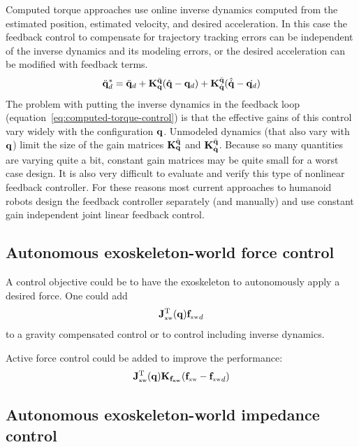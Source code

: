 \documentclass[letterpaper,12pt,fullpage]{article}
\newcommand{\xw}{{\mbox {\tiny xw}}}
\begin{document}
Computed torque approaches use online inverse dynamics computed from the estimated
position, estimated velocity, and desired acceleration.
In this case the feedback control to compensate for trajectory tracking errors can
be independent of the inverse dynamics and its modeling errors, or the desired
acceleration can be modified with feedback terms.
\begin{equation}
\ddot{{\bf q}}_d^* = \ddot{{\bf q}}_{d} + {\bf K}_{{\bf q}}^{\ddot{{\bf q}}} ( \hat{{\bf q}} - {\bf q}_d ) 
+ {\bf K}_{\dot{{\bf q}}}^{\ddot{{\bf q}}} ( \hat{\dot{{\bf q}}} - \dot{{\bf q}_d} )
\label{eq:computed-torque-control}
\end{equation}
The problem with putting the inverse dynamics in the feedback loop 
(equation~\ref{eq:computed-torque-control})
is that the
effective gains of this control vary widely with the configuration ${\bf q}$.
Unmodeled dynamics (that also vary with ${\bf q}$) limit the size of the gain matrices
${\bf K}_{{\bf q}}^{\ddot{{\bf q}}}$ and ${\bf K}_{\dot{{\bf q}}}^{\ddot{{\bf q}}}$. Because so many quantities
are varying quite a bit, constant gain matrices may be quite small for a worst case
design. It is also very difficult to evaluate and 
verify this type of nonlinear feedback controller.
For these reasons most current approaches to humanoid
robots design the feedback controller
separately (and manually) 
and use constant gain independent joint linear feedback control.

\subsection{Autonomous exoskeleton-world force control}

A control objective could be to have the exoskeleton to autonomously
apply a desired force.
One could add
\begin{equation}
\mJ_{\xw}^{\tr}(\vq) {\vf_{\xw}}_d
\end{equation}
to a gravity compensated control or to control including inverse dynamics.

Active force control could be added to improve the performance:
\begin{equation}
\mJ_{\xw}^{\tr}(\vq) \mK_{\vf_{\xw}} (\vf_{\xw} - {\vf_{\xw}}_d)
\end{equation}

\subsection{Autonomous exoskeleton-world impedance control}
\label{sec:impw}
\end{document}
